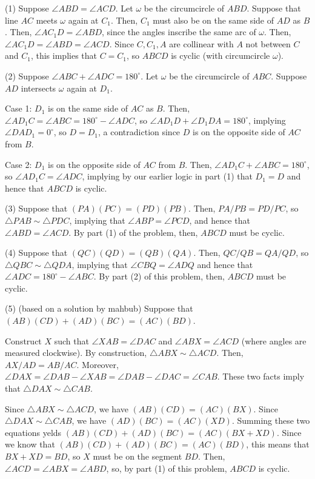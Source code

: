 \begin{mdsoln}
    (1) Suppose $ \angle ABD=\angle ACD$. Let $ \omega$ be the circumcircle of $ ABD$. Suppose that line $ AC$ meets $ \omega$ again at $ C_1$. Then, $ C_1$ must also be on the same side of $ AD$ as $ B$. Then, $ \angle AC_1D=\angle ABD$, since the angles inscribe the same arc of $ \omega$. Then, $ \angle AC_1D=\angle ABD=\angle ACD$. Since $ C,C_1,A$ are collinear with $ A$ not between $ C$ and $ C_1$, this implies that $ C=C_1$, so $ ABCD$ is cyclic (with circumcircle $ \omega$).

(2) Suppose $ \angle ABC+\angle ADC=180^\circ$. Let $ \omega$ be the circumcircle of $ ABC$. Suppose $ AD$ intersects $ \omega$ again at $ D_1$.

Case 1: $ D_1$ is on the same side of $ AC$ as $ B$. Then, $ \angle AD_1C=\angle ABC=180^\circ-\angle ADC$, so $ \angle AD_1D+\angle D_1DA=180^\circ$, implying $ \angle DAD_1=0^\circ$, so $ D=D_1$, a contradiction since $ D$ is on the opposite side of $ AC$ from $ B$.

Case 2: $ D_1$ is on the opposite side of $ AC$ from $ B$. Then, $ \angle AD_1C+\angle ABC=180^\circ$, so $ \angle AD_1C=\angle ADC$, implying by our earlier logic in part (1) that $ D_1=D$ and hence that $ ABCD$ is cyclic.

(3) Suppose that $ (PA)(PC)=(PD)(PB)$. Then, $ PA/PB=PD/PC$, so $ \triangle PAB\sim \triangle PDC$, implying that $ \angle ABP=\angle PCD$, and hence that $ \angle ABD=\angle ACD$. By part (1) of the problem, then, $ ABCD$ must be cyclic.

(4) Suppose that $ (QC)(QD)=(QB)(QA)$. Then, $ QC/QB=QA/QD$, so $ \triangle QBC\sim \triangle QDA$, implying that $ \angle CBQ=\angle ADQ$ and hence that $ \angle ADC=180^\circ-\angle ABC$. By part (2) of this problem, then, $ ABCD$ must be cyclic.

(5) (based on a solution by mahbub)
Suppose that $ (AB)(CD)+(AD)(BC)=(AC)(BD)$.

Construct $ X$ such that $ \angle XAB=\angle DAC$ and $ \angle ABX=\angle ACD$ (where angles are measured clockwise). By construction, $ \triangle ABX\sim \triangle ACD$. Then, $ AX/AD=AB/AC$. Moreover, $ \angle DAX=\angle DAB-\angle XAB=\angle DAB-\angle DAC=\angle CAB$. These two facts imply that $ \triangle DAX\sim \triangle CAB$.

Since $ \triangle ABX\sim \triangle ACD$, we have $ (AB)(CD)=(AC)(BX)$. Since $ \triangle DAX\sim \triangle CAB$, we have $ (AD)(BC)=(AC)(XD)$. Summing these two equations yelds $ (AB)(CD)+(AD)(BC)=(AC)(BX+XD)$. Since we know that $ (AB)(CD)+(AD)(BC)=(AC)(BD)$, this means that $ BX+XD=BD$, so $ X$ must be on the segment $ BD$. Then, $ \angle ACD=\angle ABX=\angle ABD$, so, by part (1) of this problem, $ ABCD$ is cyclic.

\end{mdsoln}
